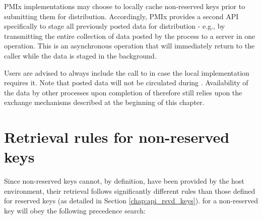 \descr

\ac{PMIx} implementations may choose to locally cache non-reserved keys prior to submitting them for distribution. Accordingly, \ac{PMIx} provides a second \ac{API} specifically to stage all previously posted data for distribution - e.g., by transmitting the entire collection of data posted by the process to a server in one operation. This is an asynchronous operation that will immediately return to the caller while the data is staged in the background.

\adviceuserstart
Users are advised to always include the call to  in case the local implementation requires it. Note that posted data will not be circulated during . Availability of the data by other processes upon completion of  therefore still relies upon the exchange mechanisms described at the beginning of this chapter.
\adviceuserend


\section{Retrieval rules for non-reserved keys}
\label{chap:data_sharing:retrules}

Since non-reserved keys cannot, by definition, have been provided by the host
environment, their retrieval follows significantly different rules than those
defined for reserved keys (as detailed in Section \ref{chap:api_rsvd_keys}).
 for a non-reserved key will obey the
following precedence search:


